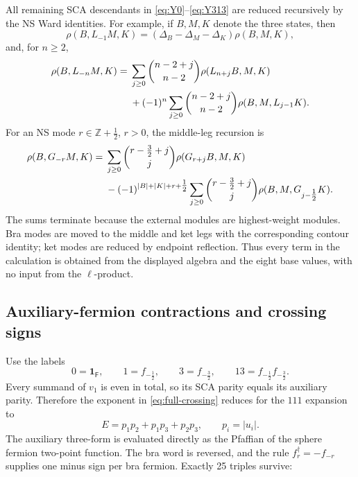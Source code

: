 \documentclass[11pt]{article}
\newcommand{\Ff}{\mathsf F}
\newcommand{\half}{\tfrac12}
\begin{document}
All remaining SCA descendants in \eqref{eq:Y0}--\eqref{eq:Y313} are reduced
recursively by the NS Ward identities.  For example, if \(B,M,K\) denote the
three states, then
\begin{equation}
 \rho(B,L_{-1}M,K)
 =(\Delta_B-\Delta_M-\Delta_K)\rho(B,M,K),
 \label{eq:ward-L1}
\end{equation}
and, for \(n\ge2\),
\begin{align}
\rho(B,L_{-n}M,K)
={}&\sum_{j\ge0}\binom{n-2+j}{n-2}
 \rho(L_{n+j}B,M,K)\notag\\
&+(-1)^n\sum_{j\ge0}\binom{n-2+j}{n-2}
 \rho(B,M,L_{j-1}K).
 \label{eq:ward-Ln}
\end{align}
For an NS mode \(r\in\mathbb Z+\half\), \(r>0\), the middle-leg recursion is
\begin{align}
\rho(B,G_{-r}M,K)
={}&\sum_{j\ge0}\binom{r-\frac32+j}{j}
 \rho(G_{r+j}B,M,K)\notag\\
&-(-1)^{|B|+|K|+r+\half}
 \sum_{j\ge0}\binom{r-\frac32+j}{j}
 \rho(B,M,G_{j-\half}K).
 \label{eq:ward-Gr}
\end{align}
The sums terminate because the external modules are highest-weight modules.
Bra modes are moved to the middle and ket legs with the corresponding contour
identity; ket modes are reduced by endpoint reflection.  Thus every term in
the calculation is obtained from the displayed algebra and the eight base
values, with no input from the \(\ell\)-product.

\subsection{Auxiliary-fermion contractions and crossing signs}

Use the labels
\begin{equation}
 0=\mathbf1_{\Ff},\qquad
 1=f_{-\half},\qquad
 3=f_{-\frac32},\qquad
 13=f_{-\half}f_{-\frac32}.
\end{equation}
Every summand of \(v_1\) is even in total, so its SCA parity equals its
auxiliary parity.  Therefore the exponent in \eqref{eq:full-crossing} reduces
for the \(111\) expansion to
\begin{equation}
 E=p_1p_2+p_1p_3+p_2p_3,
 \qquad p_i=|u_i|.
 \label{eq:reduced-crossing}
\end{equation}
The auxiliary three-form is evaluated directly as the Pfaffian of the sphere
fermion two-point function.  The bra word is reversed, and the rule
\(f_r^\dagger=-f_{-r}\) supplies one minus sign per bra fermion.  Exactly 25
triples survive:
\end{document}
